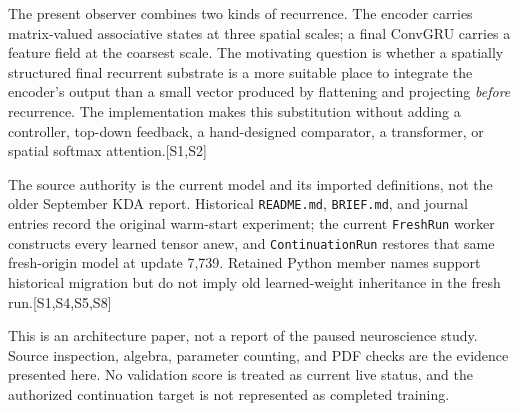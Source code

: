 \documentclass[10pt,letterpaper]{article}
\newcommand{\src}[1]{\textcolor{accent}{\textsf{[#1]}}}
\begin{document}
The present observer combines two kinds of recurrence. The encoder carries matrix-valued associative states at three spatial scales; a final ConvGRU carries a feature field at the coarsest scale. The motivating question is whether a spatially structured final recurrent substrate is a more suitable place to integrate the encoder's output than a small vector produced by flattening and projecting \emph{before} recurrence. The implementation makes this substitution without adding a controller, top-down feedback, a hand-designed comparator, a transformer, or spatial softmax attention.\src{S1,S2}

The source authority is the current model and its imported definitions, not the older September KDA report. Historical \texttt{README.md}, \texttt{BRIEF.md}, and journal entries record the original warm-start experiment; the current \texttt{FreshRun} worker constructs every learned tensor anew, and \texttt{ContinuationRun} restores that same fresh-origin model at update 7,739. Retained Python member names support historical migration but do not imply old learned-weight inheritance in the fresh run.\src{S1,S4,S5,S8}

This is an architecture paper, not a report of the paused neuroscience study. Source inspection, algebra, parameter counting, and PDF checks are the evidence presented here. No validation score is treated as current live status, and the authorized continuation target is not represented as completed training.
\end{document}
